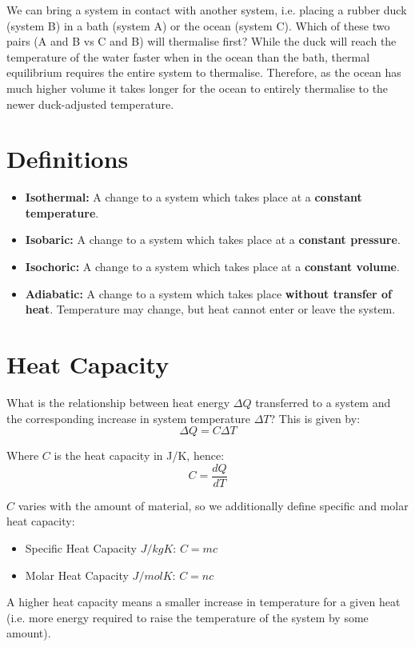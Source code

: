 We can bring a system in contact with another system, i.e. placing a rubber duck (system B) in a bath (system A) or the ocean (system C). Which of these two pairs (A and B vs C and B) will thermalise first? While the duck will reach the temperature of the water faster when in the ocean than the bath, thermal equilibrium requires the entire system to thermalise. Therefore, as the ocean has much higher volume it takes longer for the ocean to entirely thermalise to the newer duck-adjusted temperature.

\section{Definitions}
\begin{itemize}
    \item \textbf{Isothermal: } A change to a system which takes place at a \textbf{constant temperature}.
    \item \textbf{Isobaric: } A change to a system which takes place at a \textbf{constant pressure}.
    \item \textbf{Isochoric: } A change to a system which takes place at a \textbf{constant volume}.
    \item \textbf{Adiabatic: } A change to a system which takes place \textbf{without transfer of heat}. Temperature may change, but heat cannot enter or leave the system.
\end{itemize}

\section{Heat Capacity}
What is the relationship between heat energy $\Delta Q$ transferred to a system and the corresponding increase in system temperature $\Delta T$? This is given by:
\[
    \Delta Q = C \Delta T
\]

Where $C$ is the heat capacity in J/K, hence:
\[
    C = \frac{dQ}{dT}
\]

$C$ varies with the amount of material, so we additionally define specific and molar heat capacity:
\begin{itemize}
    \item Specific Heat Capacity $J/kgK$: $C = mc$
    \item Molar Heat Capacity $J/molK$: $C = nc$
\end{itemize}

A higher heat capacity means a smaller increase in temperature for a given heat (i.e. more energy required to raise the temperature of the system by some amount).


